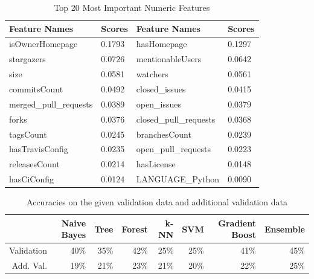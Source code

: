 \begin{table}[h]
	\centering
	\caption{Top 20 Most Important Numeric Features}
	\label{feature_importance_numeric}
	\begin{tabular}{|l|l|l|l|}
	\hline
		Feature Names & Scores & Feature Names & Scores \\ \hline
		isOwnerHomepage  &   0.1793 & hasHomepage & 0.1297 \\ \hline
		stargazers  &   0.0726 & mentionableUsers & 0.0642 \\ \hline
		size  &   0.0581 & watchers & 0.0561 \\ \hline
		commitsCount  &   0.0492 & closed\_issues & 0.0415 \\ \hline
		merged\_pull\_requests  &   0.0389 & open\_issues & 0.0379 \\ \hline
		forks  &   0.0376 & closed\_pull\_requests & 0.0368 \\ \hline
		tagsCount  &   0.0245 & branchesCount & 0.0239 \\ \hline
		hasTravisConfig  &   0.0235 & open\_pull\_requests & 0.0223 \\ \hline
		releasesCount  &   0.0214 & hasLicense & 0.0148 \\ \hline
		hasCiConfig  &   0.0124 & LANGUAGE\_Python & 0.0090 \\ \hline
	\end{tabular}
\end{table}

\begin{table}[h]
	\label{benchmark_numeric}
	\centering
	\caption{Accuracies on the given validation data and additional validation data}
	\begin{tabular}{|r|r|r|r|r|r|r|r|}
	\hline
	          & Naive Bayes & Tree & Forest & k-NN & SVM & Gradient Boost & Ensemble \\ \hline
	Validation& 40\%        & 35\%          & 42\%          & 25\% & 25\% & 41\% & 45\%         \\ \hline
	Add. Val. & 19\%        & 21\%          & 23\%          & 21\% & 20\% & 22\% & 25\%         \\ \hline
	\end{tabular}
\end{table}

